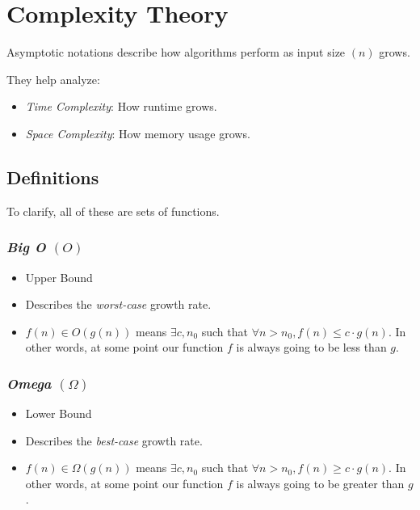\newpage
\section{Complexity Theory}

Asymptotic notations describe how algorithms perform as input size \((n)\) grows.

They help analyze:

\begin{itemize}
  
    \item \emph{Time Complexity}: How runtime grows.
  
    \item \emph{Space Complexity}: How memory usage grows.

\end{itemize}

\subsection{Definitions}

To clarify, all of these are sets of functions.

\subsubsection{\emph{Big O} \texorpdfstring{\((O)\)}{}} 
    
\begin{itemize}
    
    \item Upper Bound
    
    \item Describes the \emph{worst-case} growth rate.
    
    \item \(f(n) \in O(g(n))\) means \(\exists c, n_0\) such that \(\forall n > n_0, f(n) \leq c \cdot g(n)\). 
          In other words,  at some point our function \(f\) is always going to be less than \(g\).

\end{itemize}

\subsubsection{\emph{Omega} \texorpdfstring{\((\Omega)\)}{}} 
    
\begin{itemize}

    \item Lower Bound

    \item Describes the \emph{best-case} growth rate.

    \item \(f(n) \in \Omega(g(n))\) means \(\exists c, n_0\) such that \(\forall n > n_0, f(n) \geq c \cdot g(n)\). 
          In other words,  at some point our function \(f\) is always going to be greater than \(g\).

\end{itemize}


